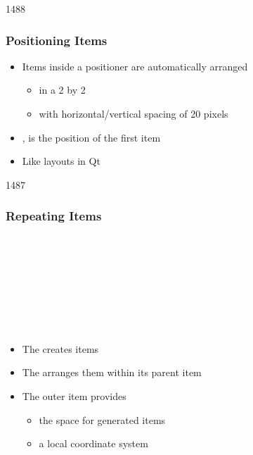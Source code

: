 \begin{slide}{1488}\frametitle{Positioning Items}



\begin{itemize}
\item Items inside a positioner are automatically arranged
  \begin{itemize}
  \item in a 2 by 2 
  \item with horizontal/vertical spacing of 20 pixels
  \end{itemize}
\item {},  is the position of the first item
\item Like layouts in Qt
\end{itemize}    


\end{slide}


\begin{slide}{1487}\frametitle{Repeating Items}

\begin{qml}
\\
\vspace*{0.5em}
\\
\\
\vspace*{0.5em}
\\
\\
\\
\qtt{~~~~\}}\\
\qtt{\}}
\end{qml}

\begin{itemize}
\item The  creates items
\item The  arranges them within its parent item
\item The outer  item provides
  \begin{itemize}
  \item the space for generated items
  \item a local coordinate system
  \end{itemize}
\end{itemize}

\end{slide}

